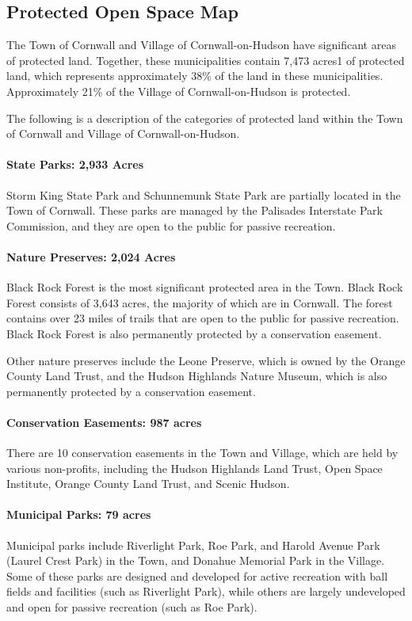 \subsection*{Protected Open Space Map}\label{subsec:protectedopenspace}
The Town of Cornwall and Village of Cornwall-on-Hudson have significant areas of 
protected land. Together, these municipalities contain 7,473 acres1 of protected 
land, which represents approximately 38\% of the land in these municipalities. 
Approximately 21\% of the Village of Cornwall-on-Hudson is protected. 

The following is a description of the categories of protected land within the 
Town of Cornwall and Village of Cornwall-on-Hudson.

\paragraph{State Parks: 2,933 Acres}Storm King State Park and Schunnemunk State Park are partially located in the Town of Cornwall. These parks are managed by the Palisades Interstate Park Commission, and they are open to the public for passive recreation.

\paragraph{Nature Preserves: 2,024 Acres}
Black Rock Forest is the most significant protected area in the Town. Black 
Rock Forest consists of 3,643 acres, the majority of which are in Cornwall. The 
forest contains over 23 miles of trails that are open to the public for passive 
recreation. Black Rock Forest is also permanently protected by a conservation 
easement. 

Other nature preserves include the Leone Preserve, which is owned by the Orange 
County Land Trust, and the Hudson Highlands Nature Museum, which is also 
permanently protected by a conservation easement.

\paragraph{Conservation Easements: 987 acres}
There are 10 conservation easements in the Town and Village, which are held by 
various non-profits, including the Hudson Highlands Land Trust, Open Space 
Institute, Orange County Land Trust, and Scenic Hudson. 

\paragraph{Municipal Parks: 79 acres}
Municipal parks include Riverlight Park, Roe Park, and Harold Avenue Park 
(Laurel Crest Park) in the Town, and Donahue Memorial Park in the Village. Some 
of these parks are designed and developed for active recreation with ball 
fields and facilities (such as Riverlight Park), while others are largely 
undeveloped and open for passive recreation (such as Roe Park).

